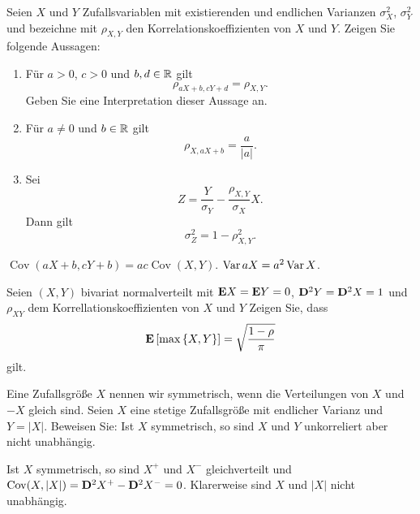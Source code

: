  Seien $X$ und $Y$
Zufallsvariablen mit existierenden und endlichen Varianzen $\sigma^2_{X}$, $\sigma^2_{Y}$ und bezeichne mit
$\rho_{X,Y}$ den Korrelationskoeffizienten von $X$ und $Y$. Zeigen Sie folgende
Aussagen: 
\begin{enumerate}
    \item Für $a>0$, $c>0$ und $b,d\in\mathbb R$ gilt
        \begin{equation*}
            \rho_{aX + b, cY + d} = \rho_{X,Y}.
        \end{equation*}
        Geben Sie eine Interpretation dieser Aussage an. 
    \item Für $a\neq 0$ und $b\in\mathbb R$ gilt
        \begin{equation*}
            \rho_{X, aX+b} = \frac{a}{|a|}.
        \end{equation*}

    \item Sei
        \begin{equation*}
            Z = \frac{Y}{\sigma_{Y}} - \frac{\rho_{X,Y}}{\sigma_{X}} X.
        \end{equation*}
        Dann gilt
        \begin{equation*}
            \sigma^2_{Z} = 1 - \rho^{2}_{X,Y}.
        \end{equation*}
\end{enumerate}

\solution$\operatorname{Cov}(aX+b, cY + b)= ac
\operatorname{Cov}(X,Y)$. $\operatorname{Var} aX = a^2 \operatorname{Var} X$. 

 Seien $(X,Y)$ bivariat normalverteilt
mit $\mathbf E X=\mathbf E Y=0$, $\mathbf D^{2}Y=\mathbf D^{2}X=1$ und $\rho_{XY}$ dem Korrellationskoeffizienten
von $X$ und $Y$
Zeigen Sie, dass
\begin{equation*}
    \mathbf E \left[ \max\left\{ X,Y \right\} \right] = \sqrt{\frac{1-\rho}{\pi}}
\end{equation*}
gilt.

 Eine Zufallsgröße $X$ nennen wir
symmetrisch, wenn die Verteilungen von $X$ und $-X$ gleich sind. Seien $X$ eine
stetige Zufallsgröße mit endlicher Varianz und $Y = |X|$. Beweisen Sie: Ist $X$
symmetrisch, so sind $X$ und $Y$ unkorreliert aber nicht unabhängig.

\solution Ist $X$ symmetrisch, so sind $X^{+}$ und $X^{-}$
gleichverteilt und $\operatorname{Cov}(X, |X|) = \mathbf D^2 X^{+} - \mathbf D^{2} X^{-}
= 0$. Klarerweise sind $X$ und $|X|$ nicht unabhängig. 

